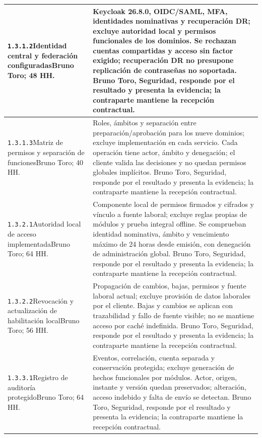 \begin{longtable}{L{52mm}L{91mm}}
\texttt{1.\allowbreak{}3.\allowbreak{}1.\allowbreak{}2}\newline Identidad central y federación configuradas\newline Bruno Toro; 48 HH. & Keycloak 26.8.0, OIDC/SAML, MFA, identidades nominativas y recuperación DR; excluye autoridad local y permisos funcionales de los dominios. Se rechazan cuentas compartidas y acceso sin factor exigido; recuperación DR no presupone replicación de contraseñas no soportada. Bruno Toro, Seguridad, responde por el resultado y presenta la evidencia; la contraparte mantiene la recepción contractual.\\\hline
\texttt{1.\allowbreak{}3.\allowbreak{}1.\allowbreak{}3}\newline Matriz de permisos y separación de funciones\newline Bruno Toro; 40 HH. & Roles, ámbitos y separación entre preparación/aprobación para los nueve dominios; excluye implementación en cada servicio. Cada operación tiene actor, ámbito y denegación; el cliente valida las decisiones y no quedan permisos globales implícitos. Bruno Toro, Seguridad, responde por el resultado y presenta la evidencia; la contraparte mantiene la recepción contractual.\\\hline
\texttt{1.\allowbreak{}3.\allowbreak{}2.\allowbreak{}1}\newline Autoridad local de acceso implementada\newline Bruno Toro; 64 HH. & Componente local de permisos firmados y cifrados y vínculo a fuente laboral; excluye reglas propias de módulos y prueba integral offline. Se comprueban identidad nominativa, ámbito y vencimiento máximo de 24 horas desde emisión, con denegación de administración global. Bruno Toro, Seguridad, responde por el resultado y presenta la evidencia; la contraparte mantiene la recepción contractual.\\\hline
\texttt{1.\allowbreak{}3.\allowbreak{}2.\allowbreak{}2}\newline Revocación y actualización de habilitación local\newline Bruno Toro; 56 HH. & Propagación de cambios, bajas, permisos y fuente laboral actual; excluye provisión de datos laborales por el cliente. Bajas y cambios se aplican con trazabilidad y fallo de fuente visible; no se mantiene acceso por caché indefinida. Bruno Toro, Seguridad, responde por el resultado y presenta la evidencia; la contraparte mantiene la recepción contractual.\\\hline
\texttt{1.\allowbreak{}3.\allowbreak{}3.\allowbreak{}1}\newline Registro de auditoría protegido\newline Bruno Toro; 64 HH. & Eventos, correlación, cuenta separada y conservación protegida; excluye generación de hechos funcionales por módulos. Actor, origen, instante y versión quedan preservados; alteración, acceso indebido y falta de envío se detectan. Bruno Toro, Seguridad, responde por el resultado y presenta la evidencia; la contraparte mantiene la recepción contractual.\\\hline

\end{longtable}
